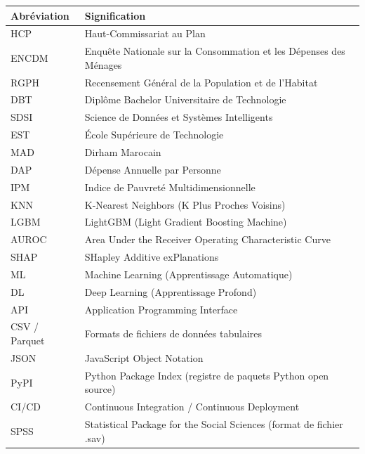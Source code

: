 \documentclass[12pt,a4paper]{report}
\begin{document}
\begin{tabular}{@{}L{3.6cm}L{10.5cm}@{}}
\toprule
\textbf{Abréviation} & \textbf{Signification} \\
\midrule
HCP      & Haut-Commissariat au Plan \\
ENCDM    & Enquête Nationale sur la Consommation et les Dépenses des Ménages \\
RGPH     & Recensement Général de la Population et de l'Habitat \\
DBT      & Diplôme Bachelor Universitaire de Technologie \\
SDSI     & Science de Données et Systèmes Intelligents \\
EST      & École Supérieure de Technologie \\
MAD      & Dirham Marocain \\
DAP      & Dépense Annuelle par Personne \\
IPM      & Indice de Pauvreté Multidimensionnelle \\
KNN      & K-Nearest Neighbors (K Plus Proches Voisins) \\
LGBM     & LightGBM (Light Gradient Boosting Machine) \\
AUROC    & Area Under the Receiver Operating Characteristic Curve \\
SHAP     & SHapley Additive exPlanations \\
ML       & Machine Learning (Apprentissage Automatique) \\
DL       & Deep Learning (Apprentissage Profond) \\
API      & Application Programming Interface \\
CSV / Parquet & Formats de fichiers de données tabulaires \\
JSON     & JavaScript Object Notation \\
PyPI     & Python Package Index (registre de paquets Python open source) \\
CI/CD    & Continuous Integration / Continuous Deployment \\
SPSS     & Statistical Package for the Social Sciences (format de fichier .sav) \\
\bottomrule
\end{tabular}

\newpage
\hypersetup{pageanchor=true}
\setcounter{page}{1}

\end{document}
